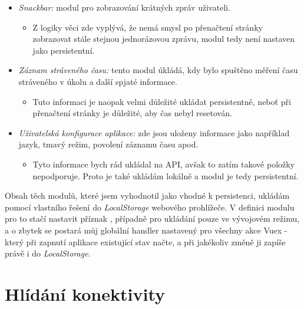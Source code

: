 \begin{itemize}
\begin{itemize}
        \end{itemize}
    \item \emph{Snackbar:} modul pro zobrazování krátných zpráv uživateli.
        \begin{itemize}
            \item Z logiky věci zde vyplývá, že nemá smysl po přenačtení stránky zobrazovat stále stejnou jednorázovou zprávu, modul tedy není nastaven jako persistentní.
        \end{itemize}
    \item \emph{Záznam stráveného času:} tento modul úkládá, kdy bylo spuštěno měření času stráveného v úkolu a další spjaté informace.
        \begin{itemize}
            \item Tuto informaci je naopak velmi důležité ukládat persistentně, neboť při přenačtení stránky je důležité, aby čas nebyl resetován.
        \end{itemize}
    \item \emph{Uživatelská konfigurace aplikace:} zde jsou uloženy informace jako například jazyk, tmavý režim, povolení záznamu času apod.
        \begin{itemize}
            \item Tyto informace bych rád ukládal na API, avšak to zatím takové položky nepodporuje. Proto je také ukládám lokálně a modul je tedy persistentní.
        \end{itemize}
\end{itemize}

Obsah těch modulů, které jsem vyhodnotil jako vhodné k persistenci, ukládám pomocí vlastního řešení do \emph{LocalStorage} webového prohlížeče. V definici modulu pro to stačí nastavit příznak , případně  pro ukládání pouze ve vývojovém režimu, a o zbytek se postará můj globální handler nastavený pro všechny akce Vuex - který při zapnutí aplikace existující stav načte, a při jakékoliv změně ji zapíše právě i do \emph{LocalStorage}.


\section{Hlídání konektivity}

